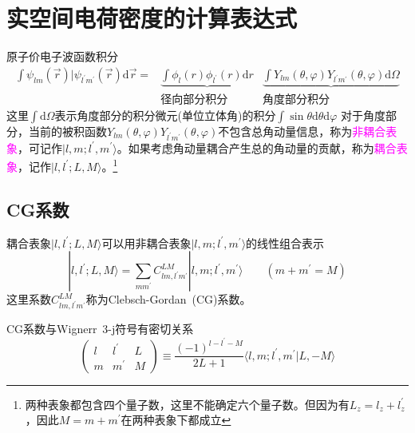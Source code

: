 \section{实空间电荷密度的计算表达式}
原子价电子波函数积分
\begin{equation}
	\begin{aligned}
		\int\psi_{lm}(\vec r)|\psi_{l^{\prime}m^{\prime}}(\vec r)\mathrm{d}\vec r=&\underbrace{\int\phi_l(r)\phi_{l^{\prime}}(r)\mathrm{d}r}&\underbrace{\int Y_{lm}(\theta,\varphi)Y_{l^{\prime}m^{\prime}}(\theta,\varphi)\mathrm{d}\Omega} \\%
		&\mbox{径向部分积分} &\mbox{角度部分积分}
	\end{aligned}
	\label{eq:wave-integral}
\end{equation}
这里$\int\mathrm{d}\Omega$表示角度部分的积分微元(单位立体角)的积分$\int\sin\theta\mathrm{d}\theta\mathrm{d}\varphi$
对于角度部分，当前的被积函数$Y_{lm}(\theta,\varphi)Y_{l^{\prime}m^{\prime}}(\theta,\varphi)$不包含总角动量信息，称为\textcolor{magenta}{非耦合表象}，可记作$|l,m;l^{\prime},m^{\prime}\rangle$。如果考虑角动量耦合产生总的角动量的贡献，称为\textcolor{magenta}{耦合表象}，记作$|l,l^{\prime};L,M\rangle$。\footnote{两种表象都包含四个量子数，这里不能确定六个量子数。但因为有$L_z=l_z+l_z^{\prime}$，因此$M=m+m^{\prime}$在两种表象下都成立}

\subsection{\rm{CG}系数}
耦合表象$|l,l^{\prime};L,M\rangle$可以用非耦合表象$|l,m;l^{\prime},m^{\prime}\rangle$的线性组合表示
\begin{equation}
	|l,l^{\prime};L,M\rangle=\sum_{mm^{\prime}}C_{lm,l^{\prime}m^{\prime}}^{LM}|l,m;l^{\prime},m^{\prime}\rangle \qquad(m+m^{\prime}=M)
	\label{eq:couple_vs_uncouple}
\end{equation}
这里系数$C_{lm,l^{\prime}m^{\prime}}^{LM}$称为\textrm{Clebsch-Gordan~(CG)}系数。

\textrm{CG}系数与\textrm{Wignerr~3-j}符号有密切关系
\begin{equation}
	\begin{pmatrix}l &l^{\prime} &L\\m &m^{\prime} &M\end{pmatrix}\equiv\dfrac{(-1)^{l-l^{\prime}-M}}{2L+1}\langle l,m;l^{\prime},m^{\prime}|L,-M\rangle
	\label{eq:CG-vs-Wigner_3-j}
\end{equation}

